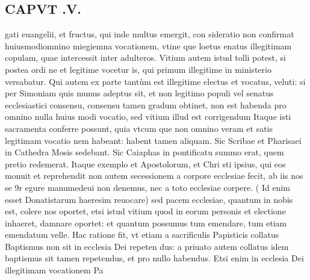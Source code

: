 \documentclass{article}
\begin{document}
\begin{pages}
\section*{CAPVT .V. }
\marginpar{[ p.365 ]}\pstart gati euangelii, et fructus, qui inde multus emergit, con sideratio non confirmat huiusmodiomnino miegiemna vocationem, vtine que loetus enatus illegitimam copulam, quae intercessit inter adulteros.  \pend\pstart Vitium autem istud tolli potest, si postea ordi ne et legitime vocetur is, qui primum illegitime in ministerio versabatur.  \pend\pstart Qui autem ex parte tantùm est illegitime electus et vocatus, veluti: si per Simoniam quis munus adeptus sit, et non legitimo populi vel senatus ecclesiastici consensu, consensu tamen gradum obtinet, non est habenda pro omnino nulla huius modi vocatio, sed vitium illud est corrigendum Itaque isti sacramenta conferre possunt, quia vtcum que non omnino veram et satis legitimam vocatio nem habeant: habent tamen aliquam. Sic Scribae et Pharisaei in Cathedra Mosis sedebant. Sic Caiaphas in pontificatu summo erat, quem pretio redemerat. Itaque exemplo et Apostolorum, et Chri sti ipsius, qui eos monuit et reprehendit non autem secessionem a corpore ecclesiae fecit, ab iis nos se 9r egure manumedeui non denemus, nec a toto ecclesiae corpere. ( Id enim esset Donatistarum haeresim reuocare) sed pacem ecclesiae, quantum in nobis est, colere nos oportet, etsi istud vitium quod in eorum personis et electione inhaeret, damnare oportet: et quantum possumus tum emendare, tum etiam emendatum velle.  \pend\pstart Hac ratione fit, vt etiam a sacrificulis Papisticis collatus Baptismus non sit in ecclesia Dei repeten dus: a priuato autem collatus idem baptismus sit tamen repetendus, et pro nullo habendus. Etsi enim in ecclesia Dei illegitimam vocationem Pa\pend

\end{pages}
\end{document}
